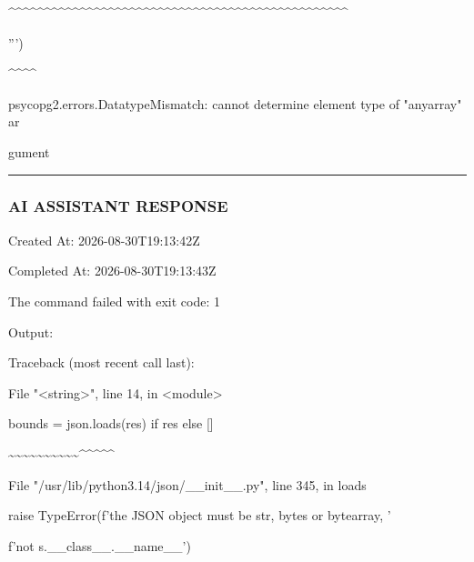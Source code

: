 \documentclass[11pt,a4paper]{article}
\begin{document}
{\textasciicircum{}\textasciicircum{}\textasciicircum{}\textasciicircum{}\textasciicircum{}\textasciicircum{}\textasciicircum{}\textasciicircum{}\textasciicircum{}\textasciicircum{}\textasciicircum{}\textasciicircum{}\textasciicircum{}\textasciicircum{}\textasciicircum{}\textasciicircum{}\textasciicircum{}\textasciicircum{}\textasciicircum{}\textasciicircum{}\textasciicircum{}\textasciicircum{}\textasciicircum{}\textasciicircum{}\textasciicircum{}\textasciicircum{}\textasciicircum{}\textasciicircum{}\textasciicircum{}\textasciicircum{}\textasciicircum{}\textasciicircum{}\textasciicircum{}\textasciicircum{}\textasciicircum{}\textasciicircum{}\textasciicircum{}\textasciicircum{}\textasciicircum{}\textasciicircum{}\textasciicircum{}\textasciicircum{}\textasciicircum{}\textasciicircum{}\textasciicircum{}\textasciicircum{}\textasciicircum{}\textasciicircum{}

''')

\textasciicircum{}\textasciicircum{}\textasciicircum{}\textasciicircum{}

psycopg2.errors.DatatypeMismatch: cannot determine element type of "anyarray" ar

gument


\hrule

\subsubsection{AI ASSISTANT RESPONSE}

Created At: 2026-08-30T19:13:42Z

Completed At: 2026-08-30T19:13:43Z


The command failed with exit code: 1

Output:

Traceback (most recent call last):

File "<string>", line 14, in <module>

bounds = json.loads(res) if res else []

\textasciitilde{}\textasciitilde{}\textasciitilde{}\textasciitilde{}\textasciitilde{}\textasciitilde{}\textasciitilde{}\textasciitilde{}\textasciitilde{}\textasciitilde{}\textasciicircum{}\textasciicircum{}\textasciicircum{}\textasciicircum{}\textasciicircum{}

File "/usr/lib/python3.14/json/\_\_init\_\_.py", line 345, in loads

raise TypeError(f'the JSON object must be str, bytes or bytearray, '

f'not {s.\_\_class\_\_.\_\_name\_\_}')

}
\end{document}
